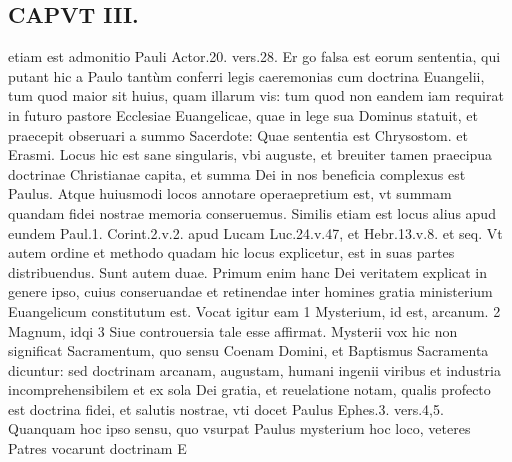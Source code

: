 \documentclass{article}
\begin{document}
\begin{pages}
\section*{CAPVT  III. }
\marginpar{[ p.175 ]}\pstart etiam est admonitio Pauli Actor.20. vers.28. Er go falsa est eorum sententia, qui putant hic a Paulo tantùm conferri legis caeremonias cum doctrina Euangelii, tum quod maior sit huius, quam illarum vis: tum quod non eandem iam requirat in futuro pastore Ecclesiae Euangelicae, quae in lege sua Dominus statuit, et praecepit obseruari a summo Sacerdote: Quae sententia est Chrysostom. et Erasmi. Locus hic est sane singularis, vbi auguste, et breuiter tamen praecipua doctrinae Christianae capita, et summa Dei in nos beneficia complexus est Paulus. Atque huiusmodi locos annotare operaepretium est, vt summam quandam fidei nostrae memoria conseruemus. Similis etiam est locus alius apud eundem Paul.1. Corint.2.v.2. apud Lucam Luc.24.v.47, et Hebr.13.v.8. et seq. Vt autem ordine et methodo quadam hic locus explicetur, est in suas partes distribuendus. Sunt autem duae. Primum enim hanc Dei veritatem explicat in genere ipso, cuius conseruandae et retinendae inter homines gratia ministerium Euangelicum constitutum est. Vocat igitur eam 1 Mysterium, id est, arcanum. 2 Magnum, idqi 3 Siue controuersia tale esse affirmat. Mysterii vox hic non significat Sacramentum, quo sensu Coenam Domini, et Baptismus Sacramenta dicuntur: sed doctrinam arcanam, augustam, humani ingenii viribus et industria incomprehensibilem et ex sola Dei gratia, et reuelatione notam, qualis profecto est doctrina fidei, et salutis nostrae, vti docet Paulus Ephes.3. vers.4,5. Quanquam hoc ipso sensu, quo vsurpat Paulus mysterium hoc loco, veteres Patres vocarunt doctrinam E\pend

\end{pages}
\end{document}
